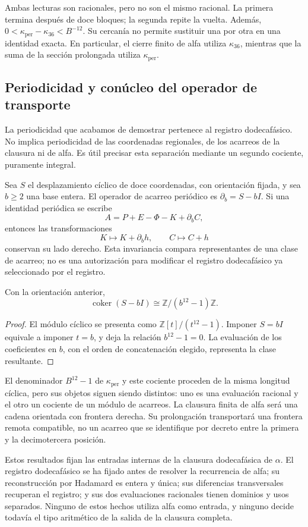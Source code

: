 Ambas lecturas son racionales, pero no son el mismo racional. La primera
termina después de doce bloques; la segunda repite la vuelta. Además,
\(0<\kappa_{\mathrm{per}}-\kappa_{36}<B^{-12}\). Su cercanía no
permite sustituir una por otra en una identidad exacta. En particular,
el cierre finito de alfa utiliza \(\kappa_{36}\), mientras que la
suma de la sección prolongada utiliza \(\kappa_{\mathrm{per}}\).



\subsection{Periodicidad y conúcleo del operador de transporte}
\label{subsec:k-clase-acarreo}

La periodicidad que acabamos de demostrar pertenece al registro dodecafásico. No implica
periodicidad de las coordenadas regionales, de los acarreos de la clausura
ni de alfa. Es útil precisar esta separación mediante un segundo
cociente, puramente integral.

Sea \(S\) el desplazamiento cíclico de doce coordenadas, con orientación
fijada, y sea \(b\geq2\) una base entera. El operador de acarreo
periódico es \(\partial_b=S-bI\). Si una identidad periódica se escribe
\[
 A=P+E-\Phi-K+\partial_bC,
\]
entonces las transformaciones
\[
 K\longmapsto K+\partial_bh,\qquad C\longmapsto C+h
\]
conservan su lado derecho. Esta invariancia compara representantes de una
clase de acarreo; no es una autorización para modificar el registro dodecafásico ya
seleccionado por el registro.

\begin{proposition}
\label{prop:k-cociente-acarreo}
Con la orientación anterior,
\[
 \operatorname{coker}(S-bI)\cong\mathbb Z/(b^{12}-1)\mathbb Z.
\]
\end{proposition}

\begin{proof}
El módulo cíclico se presenta como
\(\mathbb Z[t]/(t^{12}-1)\). Imponer \(S=bI\) equivale a imponer
\(t=b\), y deja la relación \(b^{12}-1=0\). La evaluación de los
coeficientes en \(b\), con el orden de concatenación elegido, representa
la clase resultante.
\end{proof}

El denominador \(B^{12}-1\) de \(\kappa_{\mathrm{per}}\) y este
cociente proceden de la misma longitud cíclica, pero sus objetos siguen
siendo distintos: uno es una evaluación racional y el otro un cociente
de un módulo de acarreos. La clausura finita de alfa será una cadena
orientada con frontera derecha. Su prolongación transportará una
frontera remota compatible, no un acarreo que se identifique por decreto
entre la primera y la decimotercera posición.

Estos resultados fijan las entradas internas de la clausura dodecafásica de
\(\alpha\). El registro dodecafásico se ha fijado antes
de resolver la recurrencia de alfa; su reconstrucción por Hadamard es
entera y única; sus diferencias transversales recuperan el registro; y
sus dos evaluaciones racionales tienen dominios y usos separados. Ninguno
de estos hechos utiliza alfa como entrada, y ninguno decide todavía el
tipo aritmético de la salida de la clausura completa.

